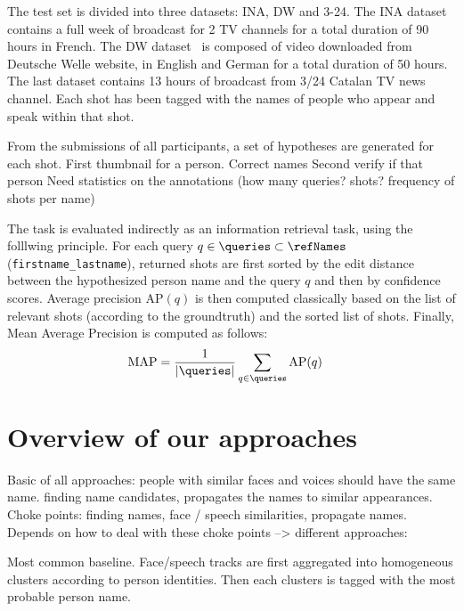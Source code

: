  The test set is divided into three datasets: INA, DW and 3-24. The INA dataset contains a full week of broadcast for 2 TV channels for a total duration of 90 hours in French. The DW dataset~\cite{EUMSSI} is composed of video downloaded from Deutsche Welle website, in English and German for a total duration of 50 hours. The last dataset contains 13 hours of broadcast from 3/24 Catalan TV news channel. Each shot has been tagged with the names of people who appear and speak within that shot.
%

From the submissions of all participants, a set of hypotheses are generated for each shot. 
%
First thumbnail for a person. Correct names 
%
Second verify if that person 
%
Need statistics on the annotations (how many queries? shots? frequency of shots per name)

 The task is evaluated indirectly as an information retrieval task, using the folllwing principle.
%
For each query $q \in \queries \subset \refNames$ (\texttt{first\-name\_lastname}), returned shots are first sorted by the edit distance between the hypothesized person name and the query $q$ and then by confidence scores.
Average precision $\text{AP}(q)$ is then computed classically based on the list of relevant shots (according to the groundtruth) and the sorted list of shots. Finally, Mean Average Precision is computed as follows:
\begin{align}
            \text{MAP} & = \frac{1}{|\queries|} \sum_{q \in \queries} \text{AP}(q) \nonumber
\end{align}


\section{Overview of our approaches}
\label{sec:overview}

Basic of all approaches: people with similar faces and voices should have the same name. finding name candidates, propagates the names to similar appearances. Choke points: finding names, face / speech similarities, propagate names. Depends on how to deal with these choke points --> different approaches:

Most common baseline. Face/speech tracks are first aggregated into homogeneous clusters according to person identities. Then each clusters is tagged with the most probable person name.

